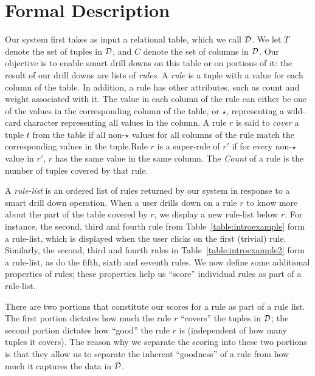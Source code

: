 
\section{Formal Description} \label{sec:formal} 

 Our system first takes as input a relational table, which we call $\mathcal{D}$. 
We let $T$ denote the set of tuples in $\mathcal{D}$, and $C$ denote 
the set of columns in $\mathcal{D}$.
Our objective is to 
enable smart drill downs on this table or on portions of it:
the result of our drill downs are lists of {\em rules}. 
A {\em rule} is a tuple with a value for each column of the table. 
In addition, a rule has other attributes, such as count and weight associated with it. 
The value in each column of the rule can either be one of the values in the corresponding column of the table, or $\star$, representing a wild-card character representing all values in the column. A rule $r$ is said to {\em cover} a tuple $t$ from the table if all non-$\star$ values for all columns of the rule match the corresponding values in the tuple.Rule $r$ is a super-rule of $r'$ if for every non-$\star$ value in $r'$, $r$ has the same value in the same column. The {\em Count} of a rule is the number of tuples covered by that rule. 

 A {\em rule-list} is an ordered list of rules returned by our system in response to a smart drill down operation. 
When a user drills down on a rule $r$ to know more about the part of the table covered by $r$, we display a new rule-list below $r$.
For instance, the second, third and fourth rule from Table~\ref{table:introexample} form a rule-list, which is displayed when the user clicks on the first (trivial) rule. Similarly, the second, third and fourth rules in Table~\ref{table:introexample2} form a rule-list, as do the fifth, sixth and seventh rules. We now define some additional properties of rules; these properties
help us ``score'' individual rules as part of a rule-list. 

 There are two portions that constitute our scores for a rule as part of a rule list. 
The first portion dictates how much the rule $r$ ``covers'' the tuples in $\mathcal{D}$;
the second portion dictates how ``good'' the rule $r$ is (independent of how many
tuples it covers). 
The reason why we separate the scoring into these two portions is
that they allow us to separate the inherent ``goodness'' of a rule from
how much it captures the data in $\mathcal{D}$.

